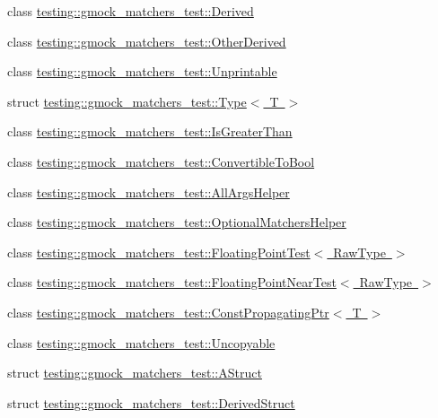 \begin{DoxyCompactItemize}
class \mbox{\hyperlink{classtesting_1_1gmock__matchers__test_1_1_derived}{testing\+::gmock\+\_\+matchers\+\_\+test\+::\+Derived}}
\item 
class \mbox{\hyperlink{classtesting_1_1gmock__matchers__test_1_1_other_derived}{testing\+::gmock\+\_\+matchers\+\_\+test\+::\+Other\+Derived}}
\item 
class \mbox{\hyperlink{classtesting_1_1gmock__matchers__test_1_1_unprintable}{testing\+::gmock\+\_\+matchers\+\_\+test\+::\+Unprintable}}
\item 
struct \mbox{\hyperlink{structtesting_1_1gmock__matchers__test_1_1_type}{testing\+::gmock\+\_\+matchers\+\_\+test\+::\+Type$<$ T $>$}}
\item 
class \mbox{\hyperlink{classtesting_1_1gmock__matchers__test_1_1_is_greater_than}{testing\+::gmock\+\_\+matchers\+\_\+test\+::\+Is\+Greater\+Than}}
\item 
class \mbox{\hyperlink{classtesting_1_1gmock__matchers__test_1_1_convertible_to_bool}{testing\+::gmock\+\_\+matchers\+\_\+test\+::\+Convertible\+To\+Bool}}
\item 
class \mbox{\hyperlink{classtesting_1_1gmock__matchers__test_1_1_all_args_helper}{testing\+::gmock\+\_\+matchers\+\_\+test\+::\+All\+Args\+Helper}}
\item 
class \mbox{\hyperlink{classtesting_1_1gmock__matchers__test_1_1_optional_matchers_helper}{testing\+::gmock\+\_\+matchers\+\_\+test\+::\+Optional\+Matchers\+Helper}}
\item 
class \mbox{\hyperlink{classtesting_1_1gmock__matchers__test_1_1_floating_point_test}{testing\+::gmock\+\_\+matchers\+\_\+test\+::\+Floating\+Point\+Test$<$ Raw\+Type $>$}}
\item 
class \mbox{\hyperlink{classtesting_1_1gmock__matchers__test_1_1_floating_point_near_test}{testing\+::gmock\+\_\+matchers\+\_\+test\+::\+Floating\+Point\+Near\+Test$<$ Raw\+Type $>$}}
\item 
class \mbox{\hyperlink{classtesting_1_1gmock__matchers__test_1_1_const_propagating_ptr}{testing\+::gmock\+\_\+matchers\+\_\+test\+::\+Const\+Propagating\+Ptr$<$ T $>$}}
\item 
class \mbox{\hyperlink{classtesting_1_1gmock__matchers__test_1_1_uncopyable}{testing\+::gmock\+\_\+matchers\+\_\+test\+::\+Uncopyable}}
\item 
struct \mbox{\hyperlink{structtesting_1_1gmock__matchers__test_1_1_a_struct}{testing\+::gmock\+\_\+matchers\+\_\+test\+::\+A\+Struct}}
\item 
struct \mbox{\hyperlink{structtesting_1_1gmock__matchers__test_1_1_derived_struct}{testing\+::gmock\+\_\+matchers\+\_\+test\+::\+Derived\+Struct}}

\end{DoxyCompactItemize}
